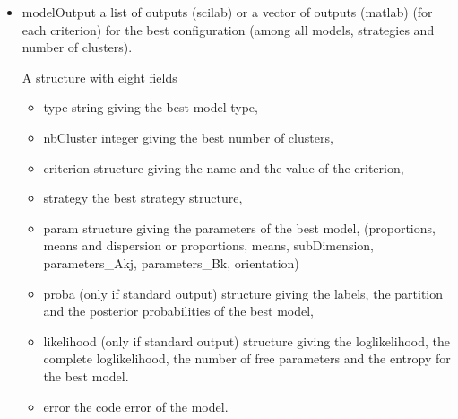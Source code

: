 \begin{itemize}
\begin{itemize}
  \item mixmodError an integer representing the code error of mixmod execution (0 if mixmod runs successfully),
  \item tabEstimError a vector representing the code error of each configuration (combination of strategy, number of clusters and model) (0 if no error),
  \item tabCriterError a vector representing the code error in the criterion value calculation for each combination
  of strategy, number of clusters and model,
  \item tabSelecError a vector representing the code error of selections of the best configuration.
\end{itemize}

{\noindent Examples of access to fields}
{\scriptsize
\begin{verbatim}
    -> (>>) output.condExe
    -> (>>) output.condExe.nbSamples
    -> (>>) output.condExe.pbDimension
    -> (>>) output.condExe.nbCluster
    -> (>>) output.condExe.criterion
    -> (>>) output.condExe.modelType                  // (%) the first model (if several models)
    -> (>>) output.condExe.strategy(1).initialization.name     // (%) the first strategy (if several strategies)
\end{verbatim}}


\item modelOutput a list of outputs (scilab) or a vector of outputs (matlab) (for each criterion)
                    for the best configuration (among all models, strategies and number of clusters).

A structure with eight fields
\begin{itemize}
  \item type string giving the best model type,
  \item nbCluster integer giving the best number of clusters,
  \item criterion structure giving the name and the value of the criterion,
  \item strategy the best strategy structure,
  \item param structure giving the parameters of the best model, (proportions, means and dispersion or
    proportions, means, subDimension, parameters\_Akj, parameters\_Bk, orientation)
  \item proba (only if standard output) structure giving the labels, the partition and the posterior probabilities
                 of the best model,
  \item likelihood (only if standard output) structure giving the loglikelihood, the complete loglikelihood,
                     the number of free parameters and the entropy for the best model.
  \item error the code error of the model.
\end{itemize}


\end{itemize}
